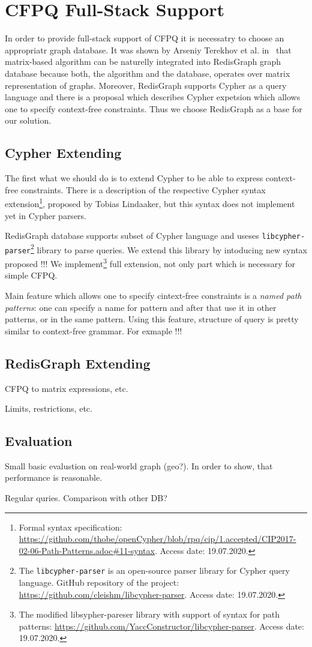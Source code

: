 \section{CFPQ Full-Stack Support}

In order to provide full-stack support of CFPQ it is necessatry to choose an appropriatr graph database.
It was shown by Arseniy Terekhov et al. in~\cite{10.1145/3398682.3399163} that matrix-based algorithm can be naturelly integrated into RedisGraph graph database because both, the algorithm and the database, operates over matrix representation of graphs.
Moreover, RedisGraph supports Cypher as a query language and there is a proposal which describes Cypher expetsion which allows one to specify context-free constraints.
Thus we choose RedisGraph as a base for our solution.  


\subsection{Cypher Extending}

The first what we should do is to extend Cypher to be able to express context-free constraints.
There is a description of the respective Cypher syntax extension\footnote{Formal syntax specification: \url{https://github.com/thobe/openCypher/blob/rpq/cip/1.accepted/CIP2017-02-06-Path-Patterns.adoc\#11-syntax}. Access date: 19.07.2020.}, proposed by Tobias Lindaaker, but this syntax does not implement yet in Cypher parsers.

RedisGraph database supports subset of Cypher language and useses \texttt{libcypher-parser}\footnote{The \texttt{libcypher-parser} is an open-source parser library for Cypher query language. GitHub repository of the project: \url{https://github.com/cleishm/libcypher-parser}. Access date: 19.07.2020.} library to parse queries.
We extend this library by intoducing new syntax proposed !!! 
We implement\footnote{The modified libsypher-pareser library with support of syntax for path patterns: \url{https://github.com/YaccConstructor/libcypher-parser}. Access date: 19.07.2020.} full extension, not only part which is necessary for simple CFPQ. 


Main feature which allows one to specify cintext-free constraints is a \textit{named path patterns}: one can specify a name for pattern and after that use it in other patterns, or in the same pattern.
Using this feature, structure of query is pretty similar to context-free grammar.
For exmaple !!!


\subsection{RedisGraph Extending}

CFPQ to matrix expressions, etc. 

Limits, restrictions, etc.

\subsection{Evaluation}

Small basic evalustion on real-world graph (geo?).
In order to show, that performance is reasonable.

Regular quries. Comparison with other DB?